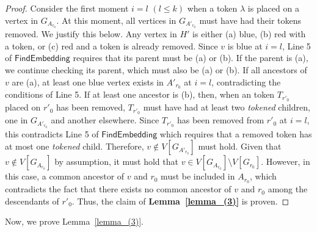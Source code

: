 \documentclass[runningheads]{llncs}
\theoremstyle{plain}
\theoremstyle{definition}
\begin{document}
\begin{proof}
    Consider the first moment $i = l$ $(l \leq k)$ when a token $\lambda$ is placed on a vertex in $G_{A_{r_0}}$. At this moment, all vertices in $G_{A'_{r_0}}$ must have had their tokens removed. We justify this below. Any vertex in $H'$ is either (a) blue, (b) red with a token, or (c) red and a token is already removed. Since $v$ is blue at $i = l$, Line 5 of $\mathsf{FindEmbedding}$ requires that its parent must be (a) or (b). If the parent is (a), we continue checking its parent, which must also be (a) or (b). If all ancestors of $v$ are (a), at least one blue vertex exists in $A'_{r_0}$ at $i = l$, contradicting the conditions of Line 5. If at least one ancestor is (b), then, when an token $T_{r'_0}$ placed on $r'_0$ has been removed, $T_{r'_0}$ must have had at least two \textit{tokened} children, one in $G_{A'_{r_0}}$ and another elsewhere. Since $T_{r'_0}$ has been removed from $r'_0$ at $i = l$, this contradicts Line 5 of $\mathsf{FindEmbedding}$ which requires that a removed token has at most one \textit{tokened} child. Therefore, $v \notin V[G_{A'_{r_0}}]$ must hold. Given that $v \notin V[G_{A_{r_0}}]$ by assumption, it must hold that $v \in V[G_{A_{r_0}}] \setminus V[G_{r_0}]$. However, in this case, a common ancestor of $v$ and $r_0$ must be included in $A_{r_0}$, which contradicts the fact that there exists no common ancestor of $v$ and $r_0$ among the descendants of $r'_0$. Thus, the claim of \textbf{Lemma~\ref{lemma_(3)}} is proven.
\end{proof}

Now, we prove Lemma~\ref{lemma_(3)}.
\end{document}
